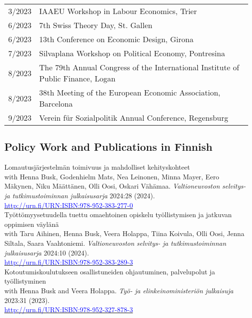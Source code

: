 \documentclass[16pt]{article}
\begin{document}
\begin{tabular}{@{}p{0.5in}p{6in}}
3/2023             & IAAEU Workshop in Labour Economics, Trier \\
6/2023             & 7th Swiss Theory Day, St. Gallen \\
6/2023             & 13th Conference on Economic Design, Girona \\
7/2023             & Silvaplana Workshop on Political Economy, Pontresina \\
8/2023             & The 79th Annual Congress of the International Institute of Public Finance, Logan \\
8/2023             & 38th Meeting of the European Economic Association, Barcelona \\
9/2023             & Verein für Sozialpolitik Annual Conference, Regensburg
\end{tabular}







\subsection*{Policy Work and Publications in Finnish}

\noindent Lomautusjärjestelmän toimivuus ja mahdolliset kehityskohteet\\
\noindent with Henna Busk, Godenhielm Mats, Nea Leinonen, Minna Mayer, Eero Mäkynen, Niku Määttänen, Olli Oosi, Oskari Vähämaa. \textit{Valtioneuvoston selvitys- ja tutkimustoiminnan julkaisusarja} 2024:28 (2024). \\
\noindent \href{http://urn.fi/URN:ISBN:978-952-383-277-0}{\textcolor{blue}{http://urn.fi/URN:ISBN:978-952-383-277-0}} \\

\noindent Työttömyysetuudella tuettu omaehtoinen opiskelu työllistymisen ja jatkuvan oppimisen väylänä\\
\noindent with Taru Aihinen, Henna Busk, Veera Holappa, Tiina Koivula, Olli Oosi, Jenna Siltala, Saara Vaahtoniemi. \textit{Valtioneuvoston selvitys- ja tutkimustoiminnan julkaisusarja} 2024:10 (2024). \\
\noindent \href{http://urn.fi/URN:ISBN:978-952-383-289-3}{\textcolor{blue}{http://urn.fi/URN:ISBN:978-952-383-289-3}} \\

\noindent Kotoutumiskoulutukseen osallistuneiden ohjautuminen, palvelupolut ja työllistyminen\\
\noindent with Henna Busk and Veera Holappa. \textit{Työ- ja elinkeinoministeriön julkaisuja} 2023:31 (2023). \\
\noindent \href{http://urn.fi/URN:ISBN:978-952-327-878-3}{\textcolor{blue}{http://urn.fi/URN:ISBN:978-952-327-878-3}} \\
\end{document}
